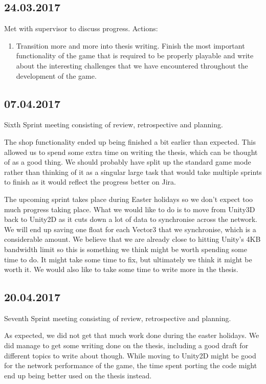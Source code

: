 \subsection*{24.03.2017}
Met with supervisor to discuss progress. Actions:
\begin{enumerate}
    \item Transition more and more into thesis writing. Finish the most important functionality of the game that is required to be properly playable and write about the interesting challenges that we have encountered throughout the development of the game. 
\end{enumerate}

\subsection*{07.04.2017}
Sixth Sprint meeting consisting of review, retrospective and planning.

The shop functionality ended up being finished a bit earlier than expected. This allowed us to spend some extra time on writing the thesis, which can be thought of as a good thing.
We should probably have split up the standard game mode rather than thinking of it as a singular large task that would take multiple sprints to finish as it would reflect the progress better on Jira. 

The upcoming sprint takes place during Easter holidays so we don't expect too much progress taking place. What we would like to do is to move from Unity3D back to Unity2D as it cuts down a lot of data to synchronise across the network. We will end up saving one float for each Vector3 that we synchronise, which is a considerable amount. We believe that we are already close to hitting Unity's 4KB bandwidth limit so this is something we think might be worth spending some time to do. It might take some time to fix, but ultimately we think it might be worth it.
We would also like to take some time to write more in the thesis. 

\subsection*{20.04.2017}
Seventh Sprint meeting consisting of review, retrospective and planning. 

As expected, we did not get that much work done during the easter holidays. We did manage to get some writing done on the thesis, including a good draft for different topics to write about though. While moving to Unity2D might be good for the network performance of the game, the time spent porting the code might end up being better used on the thesis instead. 

